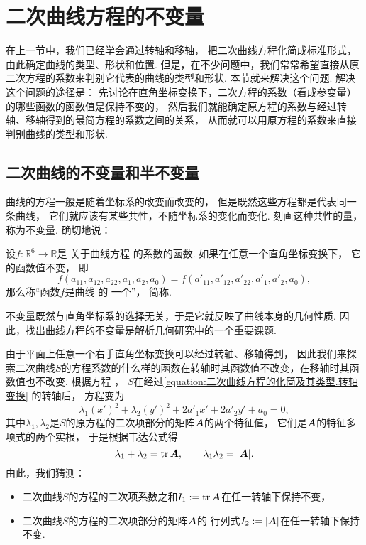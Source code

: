 \section{二次曲线方程的不变量}
在上一节中，我们已经学会通过转轴和移轴，
把二次曲线方程化简成标准形式，由此确定曲线的类型、形状和位置.
但是，在不少问题中，我们常常希望直接从原二次方程的系数来判别它代表的曲线的类型和形状.
本节就来解决这个问题.
解决这个问题的途径是：
先讨论在直角坐标变换下，二次方程的系数（看成参变量）的哪些函数的函数值是保持不变的，
然后我们就能确定原方程的系数与经过转轴、移轴得到的最简方程的系数之间的关系，
从而就可以用原方程的系数来直接判别曲线的类型和形状.

\subsection{二次曲线的不变量和半不变量}
曲线的方程一般是随着坐标系的改变而改变的，
但是既然这些方程都是代表同一条曲线，
它们就应该有某些共性，不随坐标系的变化而变化.
刻画这种共性的量，称为不变量.
确切地说：
\begin{definition}
设\(f\colon \mathbb{R}^6 \to \mathbb{R}\)是
关于曲线方程  的系数的函数.
如果在任意一个直角坐标变换下，
它的函数值不变，
即\begin{equation*}
	f(a_{11},a_{12},a_{22},a_1,a_2,a_0)
	= f(a'_{11},a'_{12},a'_{22},a'_1,a'_2,a_0),
\end{equation*}
那么称“函数\(f\)是曲线  的
一个”，
简称.
\end{definition}

不变量既然与直角坐标系的选择无关，于是它就反映了曲线本身的几何性质.
因此，找出曲线方程的不变量是解析几何研究中的一个重要课题.

由于平面上任意一个右手直角坐标变换可以经过转轴、移轴得到，
因此我们来探索二次曲线\(S\)的方程系数的什么样的函数在转轴时其函数值不改变，在移轴时其函数值也不改变.
根据方程 ，
\(S\)在经过\cref{equation:二次曲线方程的化简及其类型.转轴变换} 的转轴后，
方程变为\begin{equation*}
	\lambda_1 (x')^2 + \lambda_2 (y')^2 + 2 a'_1 x' + 2 a'_2 y' + a_ 0 = 0,
\end{equation*}
其中\(\lambda_1,\lambda_2\)是\(S\)的原方程的二次项部分的矩阵\(\boldsymbol{A}\)的两个特征值，
它们是\(\boldsymbol{A}\)的特征多项式的两个实根，
于是根据韦达公式得\begin{equation*}
	\lambda_1 + \lambda_2 = \tr\boldsymbol{A},
	\qquad
	\lambda_1 \lambda_2 = \abs{\boldsymbol{A}}.
\end{equation*}
由此，我们猜测：\begin{itemize}
	\item 二次曲线\(S\)的方程的二次项系数之和\(I_1 := \tr\boldsymbol{A}\)在任一转轴下保持不变，
	\item 二次曲线\(S\)的方程的二次项部分的矩阵\(\boldsymbol{A}\)的
	行列式\(I_2 := \abs{\boldsymbol{A}}\)在任一转轴下保持不变.
\end{itemize}

